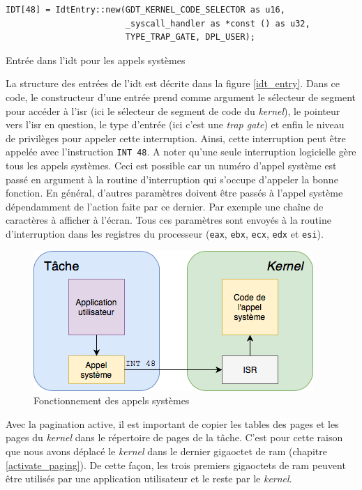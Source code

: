 \begin{code}
\begin{verbatim}
IDT[48] = IdtEntry::new(GDT_KERNEL_CODE_SELECTOR as u16,
                        _syscall_handler as *const () as u32,
                        TYPE_TRAP_GATE, DPL_USER);
\end{verbatim}
\caption{Entrée dans l'\acrshort{idt} pour les appels systèmes}
\label{lst:tasks:syscalls:idtentry}
\end{code} \medbreak

La structure des entrées de l'\acrshort{idt} est décrite dans la figure \ref{idt_entry}.
Dans ce code, le constructeur d'une entrée prend comme argument le sélecteur de
segment pour accéder à l'\acrshort{isr} (ici le sélecteur de segment de code du
\textit{kernel}), le pointeur vers l'\acrshort{isr} en question, le type d'entrée
(ici c'est une \textit{trap gate}) et enfin le niveau de privilèges pour appeler
cette interruption. Ainsi, cette interruption peut être appelée avec l'instruction
\texttt{INT 48}. A noter qu'une seule interruption logicielle gère tous
les appels systèmes. Ceci est possible car un numéro d'appel système est passé en
argument à la routine d'interruption qui s'occupe d'appeler la bonne fonction.
En général, d'autres paramètres doivent être passés à l'appel système dépendamment
de l'action faite par ce dernier. Par exemple une chaîne de caractères à afficher
à l'écran. Tous ces paramètres sont envoyés à la routine d'interruption dans les
registres du processeur (\texttt{eax}, \texttt{ebx}, \texttt{ecx},
\texttt{edx} et \texttt{esi}).

\begin{figure}[!h]
  \centering
  \includegraphics[scale=.7]{images/syscall.png}
  \caption{Fonctionnement des appels systèmes}
  \label{syscall}
\end{figure}

Avec la pagination active, il est important de copier les tables des pages et les
pages du \textit{kernel} dans le répertoire de pages de la tâche. C'est pour cette
raison que nous avons déplacé le \textit{kernel} dans le dernier gigaoctet de
\acrshort{ram} (chapitre \ref{activate_paging}). De cette façon, les trois premiers
gigaoctets de \acrshort{ram} peuvent être utilisés par une application utilisateur
et le reste par le \textit{kernel}.

